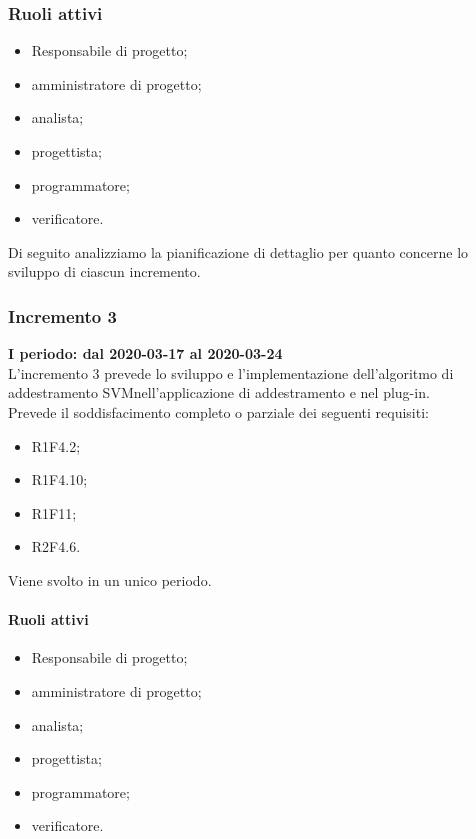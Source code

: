 \subsubsection*{Ruoli attivi}
\begin{itemize}
	\item Responsabile di progetto\glo;
	\item amministratore di progetto\glo;
	\item analista;
	\item progettista;
	\item programmatore;
	\item verificatore.
\end{itemize}
Di seguito analizziamo la pianificazione di dettaglio per quanto concerne lo sviluppo di ciascun incremento.

\subsubsection{Incremento 3}
\textbf{I periodo: dal 2020-03-17 al 2020-03-24} \\ 
L'incremento 3 prevede lo sviluppo e l'implementazione dell'algoritmo di addestramento SVM\glosp nell'applicazione di addestramento e nel plug-in. 
\\Prevede il soddisfacimento completo o parziale dei seguenti requisiti:
\begin{itemize}
	\item R1F4.2;
	\item R1F4.10;
	\item R1F11;
	\item R2F4.6.
\end{itemize}
Viene svolto in un unico periodo.
\paragraph{Ruoli attivi}
\begin{itemize}
	\item Responsabile di progetto\glo;
	\item amministratore di progetto\glo;
	\item analista;
	\item progettista;
	\item programmatore;
	\item verificatore.
\end{itemize}
